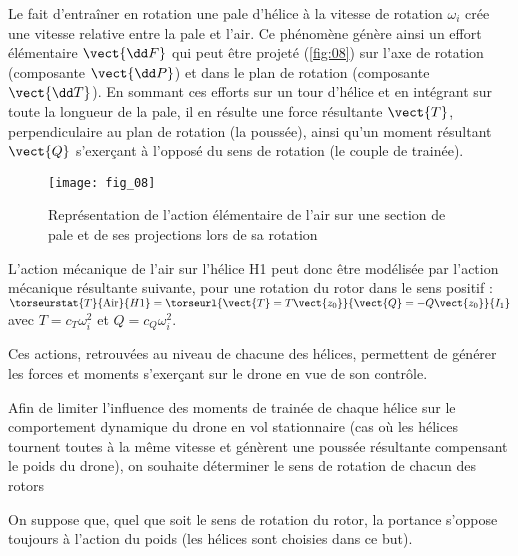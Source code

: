 Le fait d’entraîner en rotation une pale d’hélice à la vitesse de rotation $\omega_i$ crée une vitesse
relative entre la pale et l’air. Ce phénomène génère ainsi un effort élémentaire $\vect{\dd F}$ qui peut
être projeté (\autoref{fig:08}) sur l’axe de rotation (composante $\vect{\dd P}$) et dans le plan de rotation (composante $\vect{\dd T}$).
En sommant ces efforts sur un tour d’hélice et en intégrant sur toute la longueur de la pale,
il en résulte une force résultante $\vect{T}$, perpendiculaire au plan de rotation (la poussée), ainsi
qu’un moment résultant $\vect{Q}$ s’exerçant à l’opposé du sens de rotation (le couple de trainée).


\begin{figure}[H]
\centering
\texttt{[image: fig\_08]}
\caption{\label{fig:08}  Représentation de l’action élémentaire de l’air sur une section de pale et de ses
projections lors de sa rotation}
\end{figure}

L’action mécanique de l’air sur l’hélice H1 peut donc être modélisée par l’action mécanique
résultante suivante, pour une rotation du rotor dans le sens positif : 
$\torseurstat{T}{\text{Air}}{H1} = \torseurl{\vect{T}=T\vect{z_0}}{\vect{Q}=-Q\vect{z_0}}{I_1}$
avec $T = c_T \omega_i^2$ et $Q=c_Q \omega_i^2$.


Ces actions, retrouvées au niveau de chacune des hélices, permettent de générer les forces
et moments s’exerçant sur le drone en vue de son contrôle.

Afin de limiter l’influence des moments de trainée de chaque hélice sur le comportement
dynamique du drone en vol stationnaire (cas où les hélices tournent toutes à la même vitesse
et génèrent une poussée résultante compensant le poids du drone), on souhaite déterminer
le sens de rotation de chacun des rotors


\begin{hypo}
On suppose que, quel que soit le sens de rotation du rotor, la portance s’oppose toujours à
l’action du poids (les hélices sont choisies dans ce but).
\end{hypo}

\ifprof
\begin{corrige}
\end{corrige}
\else
\fi

